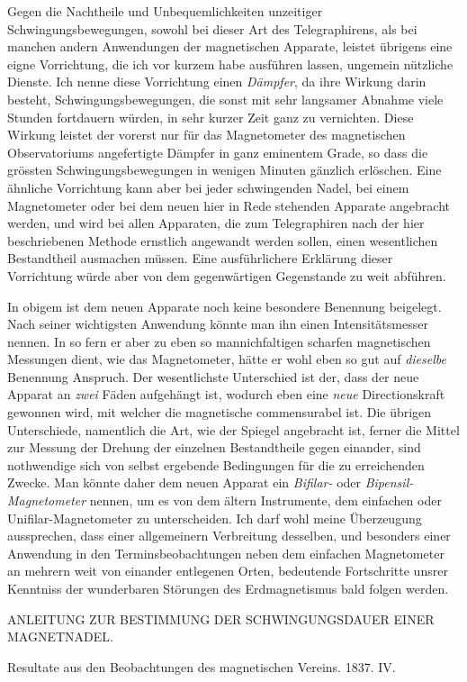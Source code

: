 Gegen die Nachtheile und Unbequemlichkeiten unzeitiger Schwingungsbewegungen, sowohl bei dieser Art des Telegraphirens, als bei manchen andern Anwendungen der magnetischen Apparate, leistet übrigens eine eigne Vorrichtung, die ich vor kurzem habe ausführen lassen, ungemein nützliche Dienste. Ich nenne diese Vorrichtung einen \textit{Dämpfer}, da ihre Wirkung darin besteht, Schwingungsbewegungen, die sonst mit sehr langsamer Abnahme viele Stunden fortdauern würden, in sehr kurzer Zeit ganz zu vernichten. Diese Wirkung leistet der vorerst nur für das Magnetometer des magnetischen Observatoriums angefertigte Dämpfer in ganz eminentem Grade, so dass die grössten Schwingungsbewegungen in wenigen Minuten gänzlich erlöschen. Eine ähnliche Vorrichtung kann aber bei jeder schwingenden Nadel, bei einem Magnetometer oder bei dem neuen hier in Rede stehenden Apparate angebracht werden, und wird bei allen Apparaten, die zum Telegraphiren nach der hier beschriebenen Methode ernstlich angewandt werden sollen, einen wesentlichen Bestandtheil ausmachen müssen. Eine ausführlichere Erklärung dieser Vorrichtung würde aber von dem gegenwärtigen Gegenstande zu weit abführen.

In obigem ist dem neuen Apparate noch keine besondere Benennung beigelegt. Nach seiner wichtigsten Anwendung könnte man ihn einen Intensitätsmesser nennen. In so fern er aber zu eben so mannichfaltigen scharfen magnetischen Messungen dient, wie das Magnetometer, hätte er wohl eben so gut auf \textit{dieselbe} Benennung Anspruch. Der wesentlichste Unterschied ist der, dass der neue Apparat an \textit{zwei} Fäden aufgehängt ist, wodurch eben eine \textit{neue} Directionskraft gewonnen wird, mit welcher die magnetische commensurabel ist. Die übrigen Unterschiede, namentlich die Art, wie der Spiegel angebracht ist, ferner die Mittel zur Messung der Drehung der einzelnen Bestandtheile gegen einander, sind nothwendige sich von selbst ergebende Bedingungen für die zu erreichenden Zwecke. Man könnte daher dem neuen Apparat ein \textit{Bifilar-} oder \textit{Bipensil-Magnetometer} nennen, um es von dem ältern Instrumente, dem einfachen oder Unifilar-Magnetometer zu unterscheiden. Ich darf wohl meine Überzeugung aussprechen, dass einer allgemeinern Verbreitung desselben, und besonders einer Anwendung in den Terminsbeobachtungen neben dem einfachen Magnetometer an mehrern weit von einander entlegenen Orten, bedeutende Fortschritte unsrer Kenntniss der wunderbaren Störungen des Erdmagnetismus bald folgen werden.

\clearpage
{}
\begin{center}
{\large ANLEITUNG ZUR BESTIMMUNG DER SCHWINGUNGSDAUER EINER MAGNETNADEL.}
\par\medskip
Resultate aus den Beobachtungen des magnetischen Vereins. 1837. IV.
\end{center}

